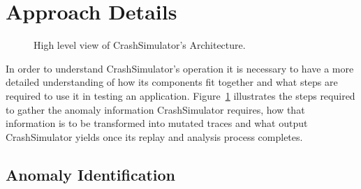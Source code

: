 \section{Approach Details}
\label{sec:approach}
    \begin{figure}[t]
        \center{}
        \caption{High level view of CrashSimulator's Architecture.}
        \label{figure:architecture}
    \end{figure}

    In order to understand CrashSimulator's operation it is necessary to have a
    more detailed understanding of how its components fit together and what
    steps are required to use it in testing an application.
    Figure~\ref{figure:architecture} illustrates the steps required to gather
    the anomaly information CrashSimulator requires, how that information is to
    be transformed into mutated traces and what output CrashSimulator yields
    once its replay and analysis process completes.

    \subsection{Anomaly Identification} \label{subsec:anomalyidentification}


